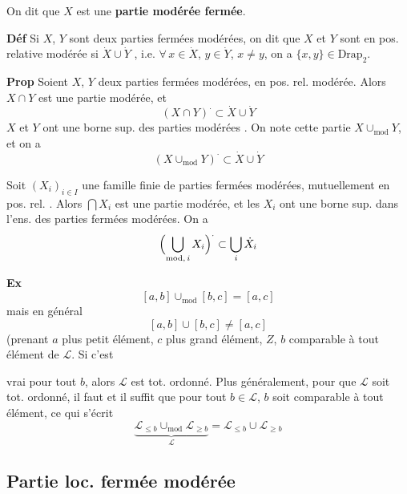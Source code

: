\documentclass[11pt,a4paper]{article}
\begin{document}
On dit que $X$ est une \textbf{partie modérée fermée}.
\marginal{\ill{}}

\textbf{Déf} Si $X$, $Y$ sont deux parties fermées modérées, on dit que $X$ et $Y$ sont en pos. relative modérée si $\dot{X} \cup \dot{Y}$ \ill{}, i.e. $\forall\, x \in \dot{X}$, $y \in \dot{Y}$, $x \neq y$, on a $\{x,y\} \in \mathrm{Drap}_2$.

\textbf{Prop} \struck{\ill{}} Soient $X$, $Y$ deux parties fermées modérées, en pos. rel. modérée. Alors $X \cap Y$ est une partie  modérée, et
\[
  \boxed{(X \cap Y)^{\cdot} \subset \dot{X} \cup \dot{Y}}
\]
 $X$ et $Y$ ont une borne sup.  \ill{} des parties modérées  . On note cette partie $X \cup_{\mathrm{mod}} Y$, et on a
\[
  \boxed{(X \cup_{\mathrm{mod}} Y)^{\cdot} \subset \dot{X} \cup \dot{Y}}
\]

Soit $(X_i)_{i \in I}$ une famille finie de parties fermées modérées, mutuellement en pos. rel. . Alors $\bigcap X_i$ est une partie modérée, et les $X_i$ ont une borne sup. dans l'ens. des parties fermées modérées. On a
\[
  \Bigl(\bigcup_{\mathrm{mod},\, i} X_i\Bigr)^{\cdot} \subset \bigcup_i \dot{X}_i
\]

\textbf{Ex}
\[
  [a,b] \cup_{\mathrm{mod}} [b,c] = [a,c]
\]
mais en général
\[
  [a,b] \cup [b,c] \neq [a,c]
\]
(prenant $a$ plus petit élément, $c$ plus grand élément, \ill{} \struck{\ill{}} $Z$, $b$ \struck{\ill{}}  comparable à tout élément de $\mathcal{L}$. Si c'est

vrai pour tout $b$, alors $\mathcal{L}$ est tot. ordonné. Plus généralement, pour que $\mathcal{L}$ soit tot. ordonné, il faut et il suffit que pour tout $b \in \mathcal{L}$, $b$ soit comparable à tout élément, ce qui s'écrit
\[
  \underbrace{\mathcal{L}_{\leq b} \cup_{\mathrm{mod}} \mathcal{L}_{\geq b}}_{\mathcal{L}} = \mathcal{L}_{\leq b} \cup \mathcal{L}_{\geq b}
\]

\subsection*{Partie loc. fermée modérée}
\end{document}
